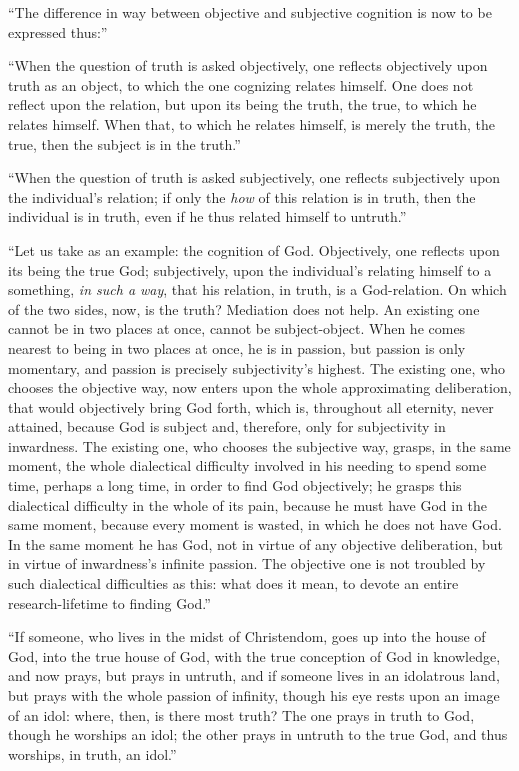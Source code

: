 \documentclass[12pt]{book}
\begin{document}
``The difference in way between objective and subjective cognition is now to be expressed thus:''

``When the question of truth is asked objectively, one reflects objectively upon truth as an object, to which the one cognizing relates himself. One does not reflect upon the relation, but upon its being the truth, the true, to which he relates himself. When that, to which he relates himself, is merely the truth, the true, then the subject is in the truth.''

``When the question of truth is asked subjectively, one reflects subjectively upon the individual's relation; if only the \emph{how} of this relation is in truth, then the individual is in truth, even if he thus related himself to untruth.''

``Let us take as an example: the cognition of God. Objectively, one reflects upon its being the true God; subjectively, upon the individual's relating himself to a something, \emph{in such a way}, that his relation, in truth, is a God-relation. On which of the two sides, now, is the truth? Mediation does not help. An existing one cannot be in two places at once, cannot be subject-object. When he comes nearest to being in two places at
once, he is in passion, but passion is only momentary, and passion is precisely subjectivity's highest. The existing one, who chooses the objective way, now enters upon the whole approximating deliberation, that would objectively bring God forth, which is, throughout all eternity, never attained, because God is subject and, therefore, only for subjectivity in inwardness. The existing one, who chooses the subjective way, grasps, in the same moment, the whole dialectical difficulty involved in his needing to spend some time, perhaps a long time, in order to find God objectively; he grasps this dialectical difficulty in the whole of its pain, because he must have God in the same moment, because every moment is wasted, in which he does not have God. In the same moment he has God, not in virtue of any objective deliberation, but in virtue of inwardness's infinite passion. The objective one is not troubled by such dialectical difficulties as this: what does it mean, to devote an entire research-lifetime to finding God.''

``If someone, who lives in the midst of Christendom, goes up into the house of God, into the true house of God, with the true conception of God in knowledge, and now prays, but prays in untruth, and if someone lives in an idolatrous land, but prays with the whole passion of infinity, though his eye rests upon an image of an idol: where, then, is there most truth? The one prays in truth to God, though he worships an idol; the other prays in untruth to the true God, and thus worships, in truth, an idol.''
\end{document}
